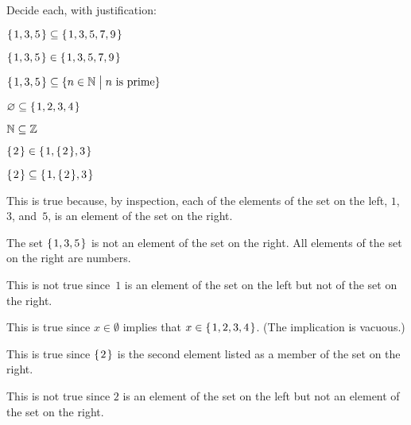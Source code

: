 \documentclass{ibl}  %
\begin{document}
\begin{ex} Decide each, with justification:
\begin{items}
\item $\mbox{$\{\hspace{0.1em}1,3,5\hspace{0.1em}\}$}\subseteq\mbox{$\{\hspace{0.1em}1,3, 5, 7, 9\hspace{0.1em}\}$}$
\item $\mbox{$\{\hspace{0.1em}1, 3, 5\hspace{0.1em}\}$}\in\mbox{$\{\hspace{0.1em}1, 3, 5, 7, 9\hspace{0.1em}\}$}$   
\item $\mbox{$\{\hspace{0.1em}1,3,5\hspace{0.1em}\}$}\subseteq\{n\in\mathbb{N} \bigm| \text{$n$ is prime}\}$
\item $\varnothing\subseteq\mbox{$\{\hspace{0.1em}1, 2, 3, 4\hspace{0.1em}\}$}$
\item $\mathbb{N}\subseteq\mathbb{Z}$
\item $\mbox{$\{\hspace{0.1em}2\hspace{0.1em}\}$}\in\mbox{$\{\hspace{0.1em}1, \mbox{$\{\hspace{0.1em}2\hspace{0.1em}\}$}, 3\hspace{0.1em}\}$}$
\item $\mbox{$\{\hspace{0.1em}2\hspace{0.1em}\}$}\subseteq\mbox{$\{\hspace{0.1em}1, \mbox{$\{\hspace{0.1em}2\hspace{0.1em}\}$}, 3\hspace{0.1em}\}$}$
\end{items}
\begin{ans}
\begin{items}
\item This is true because, by inspection, each of the elements of the set
  on the left, $1$, $3$, and~$5$, is an element of the set on the right.
\item The set $\mbox{$\{\hspace{0.1em}1,3,5\hspace{0.1em}\}$}$ is not an element of the set on the right.
  All elements of the set on the right are numbers.
\item This is not true since~$1$ is an element of the set on the left
  but not of the set on the right.
\item This is true since $x\in\emptyset$ implies that $x\in\mbox{$\{\hspace{0.1em}1, 2, 3, 4\hspace{0.1em}\}$}$. 
  (The implication is vacuous.)
\item This is true since $\mbox{$\{\hspace{0.1em}2\hspace{0.1em}\}$}$ is the second element listed as a
  member of the set on the right.
\item This is not true since $2$ is an element of the set on the left but
  not an element of the set on the right.
\end{items}
\end{ans}
\end{ex}
\end{document}

